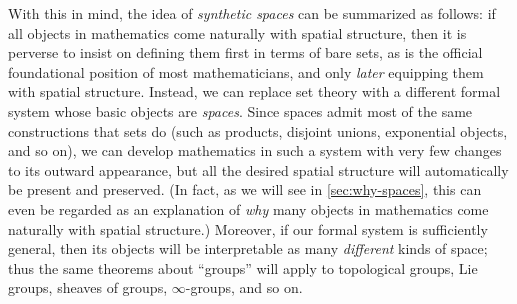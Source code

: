 \documentclass[12pt]{article}
\def\oo{\ensuremath{\infty}}
\numberwithin{equation}{section}
\begin{document}
With this in mind, the idea of \emph{synthetic spaces} can be summarized as follows:
if all objects in mathematics come naturally with spatial structure, then it is perverse to insist on defining them first in terms of bare sets, as is the official foundational position of most mathematicians, and only \emph{later} equipping them with spatial structure. %
Instead, we can replace set theory with a different formal system whose basic objects are \emph{spaces}. %
Since spaces admit most of the same constructions that sets do (such as products, disjoint unions, exponential objects, and so on), we can develop mathematics in such a system with very few changes to its outward appearance, but all the desired spatial structure will automatically be present and preserved.
(In fact, as we will see in \cref{sec:why-spaces}, this can even be regarded as an explanation of \emph{why} many objects in mathematics come naturally with spatial structure.)
Moreover, if our formal system is sufficiently general, then its objects will be interpretable as many \emph{different} kinds of space; thus the same theorems about ``groups'' will apply to topological groups, Lie groups, sheaves of groups, \oo-groups, and so on.
\end{document}
